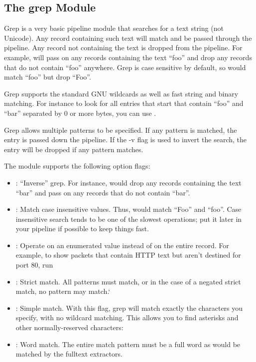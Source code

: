 \subsection{The grep Module}
\label{sec:grep}
Grep is a very basic pipeline module that searches for a text string (not Unicode). Any record containing such text will match and be passed through the pipeline. Any record not containing the text is dropped from the pipeline. For example,  will pass on any records containing the text ``foo'' and drop any records that do not contain ``foo'' anywhere. Grep is case sensitive by default, so  would match ``foo'' but drop ``Foo''.

Grep supports the standard GNU wildcards as well as fast string and binary matching. For instance to look for all entries that start that contain ``foo'' and ``bar'' separated by 0 or more bytes, you can use .

Grep allows multiple patterns to be specified. If any pattern is matched, the entry is passed down the pipeline. If the -v flag is used to invert the search, the entry will be dropped if any pattern matches.

The module supports the following option flags:

\begin{itemize}
\item {}: ``Inverse'' grep. For instance,  would drop any records containing the text ``bar'' and pass on any records that do not contain ``bar''.
\item {}: Match case insensitive values. Thus,  would match ``Foo'' and ``foo''. Case insensitive search tends to be one of the slowest operations; put it later in your pipeline if possible to keep things fast.
\item {}: Operate on an enumerated value instead of on the entire record. For example, to show packets that contain HTTP text but aren’t destined for port 80, run 
\item {}: Strict match. All patterns must match, or in the case of a negated strict match, no pattern may match.`
\item {}: Simple match. With this flag, grep will match exactly the characters you specify, with no wildcard matching. This allows you to find asterisks and other normally-reserved characters: 
\item {}: Word match. The entire match pattern must be a full word as would be matched by the fulltext extractors.
\end{itemize}

